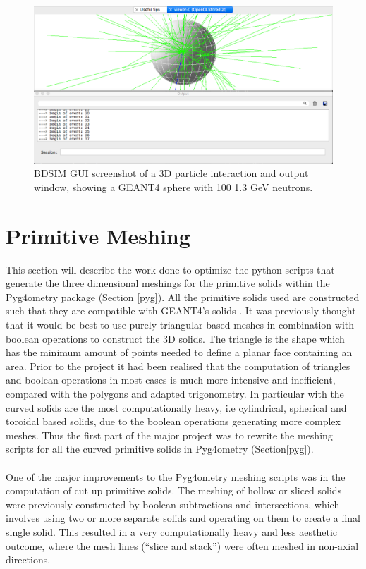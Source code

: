\documentclass[12pt,a4paper]{article}
\begin{document}
\begin{figure}[h!]
\centering
\includegraphics[scale=0.4]{Images//BDSIM//screengrab.png}
\caption[width=\columnwidth]{BDSIM GUI screenshot of a 3D particle interaction and output window, showing a GEANT4 sphere with 100 1.3 GeV neutrons.}
\label{screengrab}
\end{figure}


\newpage
\section{Primitive Meshing}
\label{prim}

This section will describe the work done to optimize the python scripts that generate the three dimensional meshings for the primitive solids within the Pyg4ometry package (Section \ref{pyg}). All the primitive solids used are constructed such that they are compatible with GEANT4's solids \cite{solids}. It was previously thought that it would be best to use purely triangular based meshes in combination with boolean operations to construct the 3D solids. The triangle is the shape which has the minimum amount of points needed to define a planar face containing an area. Prior to the project it had been realised that the computation of triangles and boolean operations in most cases is much more intensive and inefficient, compared with the polygons and adapted trigonometry. In particular with the curved solids are the most computationally heavy, i.e cylindrical, spherical and toroidal based solids, due to the boolean operations generating more complex meshes. Thus the first part of the major project was to rewrite the meshing scripts for all the curved primitive solids in Pyg4ometry (Section\ref{pyg}).
\\\\
One of the major improvements to the Pyg4ometry meshing scripts was in the computation of cut up primitive solids. The meshing of hollow or sliced solids were previously constructed by boolean subtractions and intersections, which involves using two or more separate solids and operating on them to create a final single solid. This resulted in a very computationally heavy and less aesthetic outcome, where the mesh lines (``slice and stack'') were often meshed in non-axial directions.
\end{document}
